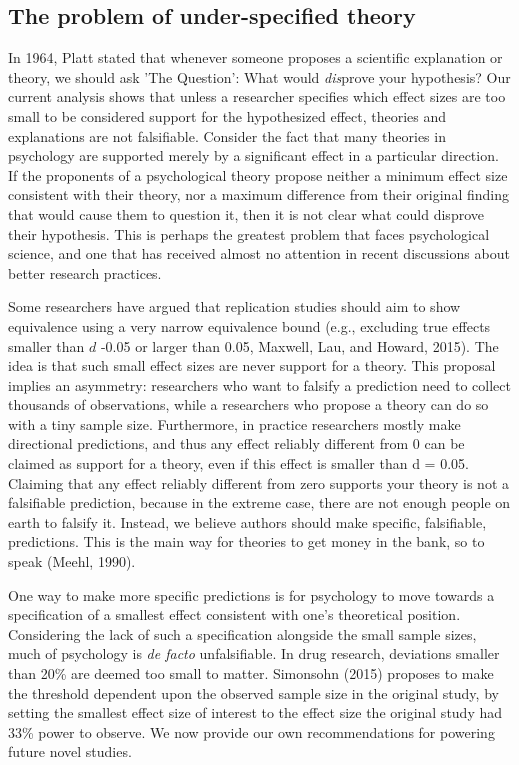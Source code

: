 \documentclass[doc,a4paper,floatsintext,draftfirst]{apa6}
\begin{document}
\subsection{The problem of under-specified theory}

In 1964, Platt stated that whenever someone proposes a scientific explanation or theory, we should ask 'The Question': What would \textit{dis}prove your hypothesis? Our current analysis shows that unless a researcher specifies which effect sizes are too small to be considered support for the hypothesized effect, theories and explanations are not falsifiable. Consider the fact that many theories in psychology are supported merely by a significant effect in a particular direction. If the proponents of a psychological theory propose neither a minimum effect size consistent with their theory, nor a maximum difference from their original finding that would cause them to question it, then it is not clear what could disprove their hypothesis. This is perhaps the greatest problem that faces psychological science, and one that has received almost no attention in recent discussions about better research practices.

\nocite{Platt:1964}

Some researchers have argued that replication studies should aim to show equivalence using a very narrow equivalence bound (e.g., excluding true effects smaller than $d$ -0.05 or larger than 0.05, Maxwell, Lau, and Howard, 2015). The idea is that such small effect sizes are never support for a theory. This proposal implies an asymmetry: researchers who want to falsify a prediction need to collect thousands of observations, while a researchers who propose a theory can do so with a tiny sample size. Furthermore, in practice researchers mostly make directional predictions, and thus any effect reliably different from 0 can be claimed as support for a theory, even if this effect is smaller than d = 0.05. Claiming that any effect reliably different from zero supports your theory is not a falsifiable prediction, because in the extreme case, there are not enough people on earth to falsify it. Instead, we believe authors should make specific, falsifiable, predictions. This is the main way for theories to get money in the bank, so to speak (Meehl, 1990). 

\nocite{Meehl:1990,Maxwell:etal:2015}

One way to make more specific predictions is for psychology to move towards a specification of a smallest effect consistent with one's theoretical position. Considering the lack of such a specification alongside the small sample sizes,  much of psychology is {\em de facto} unfalsifiable. In drug research, deviations smaller than 20\% are deemed too small to matter. Simonsohn (2015) proposes to make the threshold dependent upon the observed sample size in the original study, by setting the smallest effect size of interest to the effect size the original study had 33\% power to observe. We now provide our own recommendations for powering future novel studies.
\end{document}
